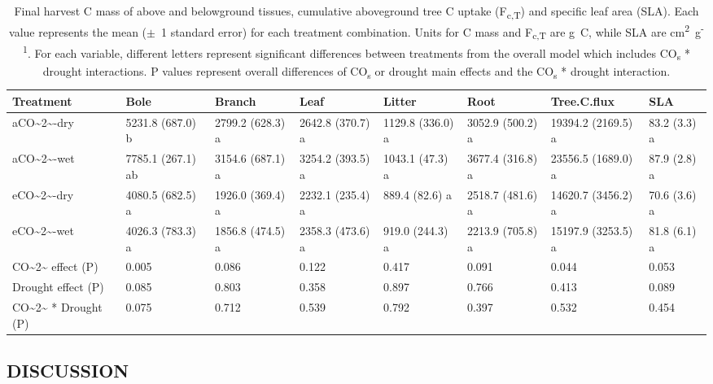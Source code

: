 \documentclass[a4paper]{article}\usepackage[]{graphicx}\usepackage[]{color}
\begin{document}
\begin{table}
\centering
\caption{Final harvest C mass of above and belowground tissues, cumulative aboveground tree C uptake (F\textsubscript{c,T}) and specific leaf area (SLA). Each value represents the mean ($\pm$~1 standard error) for each treatment combination. Units for C mass and F\textsubscript{c,T} are g~C, while SLA are cm\textsuperscript{2}~g\textsuperscript{-1}. For each variable, different letters represent significant differences between treatments from the overall model which includes CO\textsubscript{s} * drought interactions. P values represent overall differences of CO\textsubscript{s} or drought main effects and the CO\textsubscript{s} * drought interaction.} 
\label{table:Table 4.1}
\begin{tabular}{llllllll}
  \hline
Treatment & Bole & Branch & Leaf & Litter & Root & Tree.C.flux & SLA \\ 
  \hline
aCO\~{}2\~{}-dry & 5231.8 (687.0) b & 2799.2 (628.3) a & 2642.8 (370.7) a & 1129.8 (336.0) a & 3052.9 (500.2) a & 19394.2 (2169.5) a & 83.2 (3.3) a \\ 
  aCO\~{}2\~{}-wet & 7785.1 (267.1) ab & 3154.6 (687.1) a & 3254.2 (393.5) a & 1043.1 (47.3) a & 3677.4 (316.8) a & 23556.5 (1689.0) a & 87.9 (2.8) a \\ 
  eCO\~{}2\~{}-dry & 4080.5 (682.5) a & 1926.0 (369.4) a & 2232.1 (235.4) a & 889.4 (82.6) a & 2518.7 (481.6) a & 14620.7 (3456.2) a & 70.6 (3.6) a \\ 
  eCO\~{}2\~{}-wet & 4026.3 (783.3) a & 1856.8 (474.5) a & 2358.3 (473.6) a & 919.0 (244.3) a & 2213.9 (705.8) a & 15197.9 (3253.5) a & 81.8 (6.1) a \\ 
   \hline
CO\~{}2\~{} effect (P) & 0.005 & 0.086 & 0.122 & 0.417 & 0.091 & 0.044 & 0.053 \\ 
  Drought effect (P) & 0.085 & 0.803 & 0.358 & 0.897 & 0.766 & 0.413 & 0.089 \\ 
  CO\~{}2\~{} * Drought (P) & 0.075 & 0.712 & 0.539 & 0.792 & 0.397 & 0.532 & 0.454 \\ 
   \hline
\end{tabular}
\end{table}



\subsection*{DISCUSSION}
\end{document}
